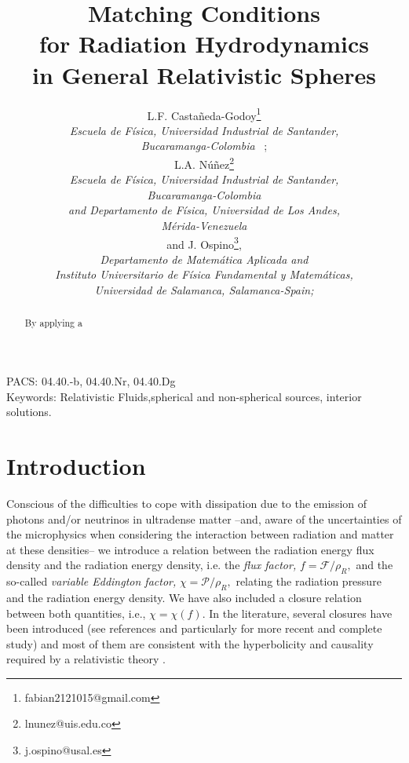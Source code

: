 \documentclass[notitlepage,letterpaper, 10pt]{article}
\begin{document}
\title {Matching Conditions\\ for Radiation Hydrodynamics \\ in General Relativistic Spheres}
\author{
L.F. Casta\~neda-Godoy\thanks{fabian2121015@gmail.com} \\
\textit{Escuela de F\'isica, Universidad Industrial de Santander,}\\ \textit{Bucaramanga-Colombia} \, ; \\
L.A. N\'u\~nez\thanks{lnunez@uis.edu.co} \\
\textit{Escuela de F\'isica, Universidad Industrial de Santander,}\\ \textit{Bucaramanga-Colombia} \\ 
\textit{and Departamento de F\'isica, Universidad de Los Andes,}\\ \textit{M\'erida-Venezuela} \\
and J. Ospino\thanks{j.ospino@usal.es}, \\ \textit{Departamento de Matem\'atica Aplicada and} \\
\textit{Instituto Universitario de F\'isica Fundamental y Matem\'aticas,}  \\ \textit{ Universidad de Salamanca, Salamanca-Spain;} \\
}
\maketitle

\begin{abstract}
By applying a 
\end{abstract} 
PACS: 04.40.-b, 04.40.Nr, 04.40.Dg \\
Keywords: Relativistic Fluids,spherical  and non-spherical sources, interior solutions.
\maketitle

\section{Introduction}

Conscious of the difficulties to cope with dissipation due to the emission of photons and/or neutrinos in ultradense matter --and, aware of the uncertainties of the microphysics when considering the interaction between radiation and matter at these densities-- we introduce a relation between the radiation energy flux density and the radiation energy density, i.e. the \textit{flux factor,} $f = {\mathcal{F}}/{\rho_{R}},$ and the so-called \textit{variable Eddington factor,} $\chi= {\mathcal{P}}/{\rho_{R}}, $ relating the radiation pressure and the radiation energy density. We have also included a closure relation between both quantities, i.e., $\chi=\chi(f).$ In the literature, several closures have been introduced (see references \cite{Levermore1984, Dominguez1997, PonsIbanezMiralles2000, SmitVandenHornBludman2000} and particularly \cite{MurchikovaAbdikamalovUrbatsch2017} for more recent and complete study) and most of them are consistent with the hyperbolicity and causality required by a relativistic theory \cite{PonsIbanezMiralles2000}.
\end{document}
